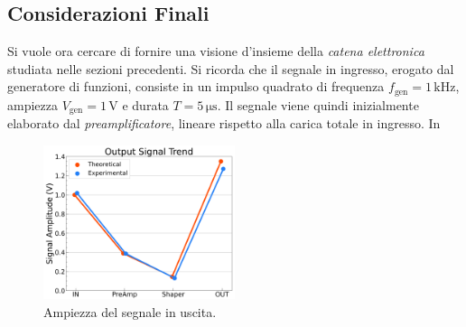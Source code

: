\documentclass[a4paper,11pt]{article} %
\begin{document}

\subsection{Considerazioni Finali}\label{s:catena_finale}

Si vuole ora cercare di fornire una visione d'insieme della \textit{catena elettronica} studiata nelle sezioni
precedenti. Si ricorda che il segnale in ingresso, erogato dal generatore di funzioni, consiste in un impulso quadrato
di frequenza $f_{\text{gen}}= 1 \,\si{\kilo\hertz}$, ampiezza $V_{\text{gen}} = 1 \,\si{\volt}$ e durata $T = 5
\,\si{\us}$. Il segnale viene quindi inizialmente elaborato dal \textit{preamplificatore}, lineare rispetto alla carica
totale in ingresso. In 

\begin{figure} 
	\centering 
	\includegraphics[width=0.5\textwidth]{../Plots/Catena/trend4.png}
	\vspace{-20pt}
   \caption{\small Ampiezza del segnale in uscita.} 
   \label{i:trend} 
\end{figure}
\end{document}

